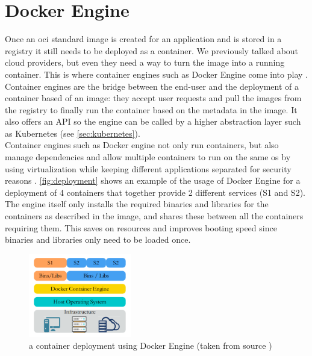 \section{Docker Engine} \label{sec:containerruntime}
Once an \acrshort{oci} standard image is created for an application and is stored in a registry it still needs to be deployed as a container. We previously talked about cloud providers, but even they need a way to turn the image into a running container. This is where container engines such as Docker Engine come into play \cite{dockerengine}. Container engines are the bridge between the end-user and the deployment of a container based of an image: they accept user requests and pull the images from the registry to finally run the container based on the metadata in the image. It also offers an API so the engine can be called by a higher abstraction layer such as Kubernetes (see \autoref{sec:kubernetes}). 
\\[10pt]

Container engines such as Docker engine not only run containers, but also manage dependencies and allow multiple containers to run on the same \acrshort{os} by using virtualization while keeping different applications separated for security reasons \cite{cnwiki}. \autoref{fig:deployment} shows an example of the usage of Docker Engine for a deployment of 4 containers that together provide 2 different services (S1 and S2). The engine itself only installs the required binaries and libraries for the containers as described in the image, and shares these between all the containers requiring them. This saves on resources and improves booting speed since binaries and libraries only need to be loaded once.
\\[10pt]

\begin{figure}[htbp]
  \centering
  \includegraphics[width=0.4\textwidth]{images/docker-containers.png} 
  \caption{a container deployment using Docker Engine (taken from source \cite{resman})}
  \label{fig:deployment}
\end{figure}

